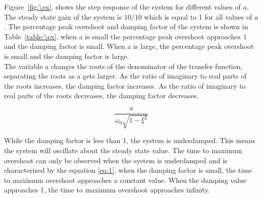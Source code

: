 Figure~\ref{fig:\ex}. shows the step response of the system for different values of $a$. The steady state gain of the system is $10/10$ which is equal to 1 for all values of $a$. The percentage peak overshoot and damping factor of the system is shown in Table~\ref{table:\ex}. when a is small the percentage peak overshoot approaches 1 and the damping factor is small. When a is large, the percentage peak overshoot is small and the damping factor is large. \\

The variable a changes the roots of the denominator of the transfer function, separating the roots as a gets larger. As the ratio of imaginary to real parts of the roots increases, the damping factor increases. As the ratio of imaginary to real parts of the roots decreases, the damping factor decreases. 

\begin{equation}
    \frac{\pi}{\omega_0\sqrt{1-\xi^2}}
    \label{eq:1}
\end{equation}

While the damping factor is less than 1, the system is underdamped. This means the system will oscillate about the steady state value. The time to maximum overshoot can only be observed when the system is underdamped and is characterized by the equation \eqref{eq:1}. when the damping factor is small, the time to maximum overshoot approaches a constant value. When the damping value approaches 1, the time to maximum overshoot approaches infinity.



